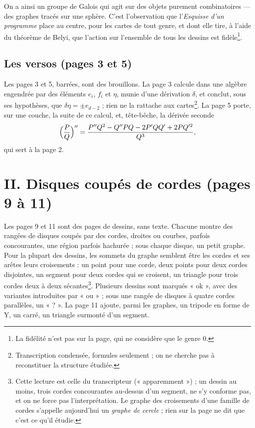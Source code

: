 \documentclass[11pt,a4paper]{article}
\begin{document}
On a ainsi un groupe de Galois qui agit sur des objets purement
combinatoires --- des graphes tracés sur une sphère. C'est l'observation que
l'\emph{Esquisse d'un programme} place au centre, pour les cartes de tout
genre, et dont elle tire, à l'aide du théorème de Belyi, que l'action sur
l'ensemble de tous les dessins est fidèle\footnote{La fidélité n'est pas sur
la page, qui ne considère que le genre $0$.}.

\subsection*{Les versos (pages 3 et 5)}

Les pages 3 et 5, barrées, sont des brouillons. La page 3 calcule dans une
algèbre engendrée par des éléments $e_i$, $f_i$ et $\eta$, munie d'une
dérivation $\delta$, et conclut, sous ses hypothèses, que $\delta \eta = \pm
e_{d-2}$ ; rien ne la rattache aux cartes\footnote{Transcription condensée,
formules seulement ; on ne cherche pas à reconstituer la structure étudiée.}.
La page 5 porte, sur une couche, la suite de ce calcul, et, tête-bêche, la
dérivée seconde
\[
\Bigl(\frac{P}{Q}\Bigr)'' = \frac{P''Q^2 - Q''PQ - 2P'QQ' + 2PQ'^2}{Q^3},
\]
qui sert à la page 2.

\section*{II. Disques coupés de cordes (pages 9 à 11)}

Les pages 9 et 11 sont des pages de dessins, sans texte. Chacune montre des
rangées de disques coupés par des cordes, droites ou courbes, parfois
concourantes, une région parfois hachurée ; sous chaque disque, un petit
graphe. Pour la plupart des dessins, les sommets du graphe semblent être les
cordes et ses arêtes leurs croisements : un point pour une corde, deux points
pour deux cordes disjointes, un segment pour deux cordes qui se croisent, un
triangle pour trois cordes deux à deux sécantes\footnote{Cette lecture est
celle du transcripteur (« apparemment ») ; un dessin au moins, trois cordes
concourantes au-dessus d'un segment, ne s'y conforme pas, et on ne force
pas l'interprétation. Le graphe des croisements d'une famille de cordes
s'appelle aujourd'hui un \emph{graphe de cercle} ; rien sur la page ne dit
que c'est ce qu'il étudie.}. Plusieurs dessins sont marqués « ok », avec
des variantes introduites par « ou » ; sous une rangée de disques à quatre
cordes parallèles, un « ? ». La page 11 ajoute, parmi les graphes, un
tripode en forme de Y, un carré, un triangle surmonté d'un segment.
\end{document}
